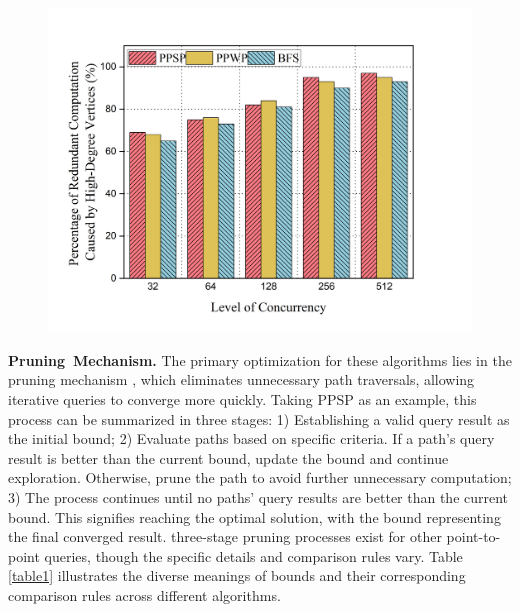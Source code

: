 \documentclass[10pt,journal,compsoc]{IEEEtran}
\begin{document}
\begin{figure}[t]
    \centering
    \includegraphics[width=\columnwidth]{picture/Zhang-fig2.png}
    \captionsetup{labelsep=period}
    \caption{}
    \label{fig2}
    \vspace{-0.5cm}
\end{figure}
{\bf{Pruning~Mechanism.}}
The primary optimization for these algorithms lies in the pruning mechanism \cite{sgraph}, which eliminates unnecessary path traversals, allowing iterative queries to converge more quickly. 
Taking PPSP as an example, this process can be summarized in three stages: 1) Establishing a valid query result as the initial bound; 2) Evaluate paths based on specific criteria. If a path's query result is better than the current bound, update the bound and continue exploration. Otherwise, prune the path to avoid further unnecessary computation; 3) The process continues until no paths' query results are better than the current bound. This signifies reaching the optimal solution, with the bound representing the final converged result.
 three-stage pruning processes exist for other point-to-point queries, though the specific details and comparison rules vary. Table \ref{table1} illustrates the diverse meanings of bounds and their corresponding comparison rules across different algorithms.
\end{document}
